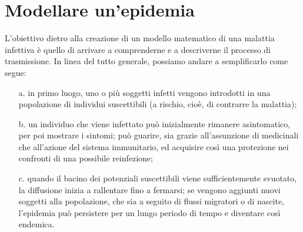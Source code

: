 \chapter{Modellare un'epidemia}
\label{chap:cap1}
L'obiettivo dietro alla creazione di un modello matematico di una malattia infettiva è quello di arrivare a comprenderne e a descriverne il processo di trasmissione. In linea del tutto generale, possiamo andare a semplificarlo come segue:
\begin{enumerate}
\item[a.] in primo luogo, uno o più soggetti infetti vengono introdotti in una popolazione di individui suscettibili (a rischio, cioè, di contrarre la malattia);
\item[b.] un individuo che viene infettato può inizialmente rimanere asintomatico, per poi mostrare i sintomi; può guarire, sia grazie all'assunzione di medicinali che all'azione del sistema immunitario, ed acquisire così una protezione nei confronti di una possibile reinfezione;
\item[c.] quando il bacino dei potenziali suscettibili viene sufficientemente svuotato, la diffusione inizia a rallentare fino a fermarsi; se vengono aggiunti nuovi soggetti alla popolazione, che sia a seguito di flussi migratori o di nascite, l'epidemia può persistere per un lungo periodo di tempo e diventare così endemica. \\
\end{enumerate}
